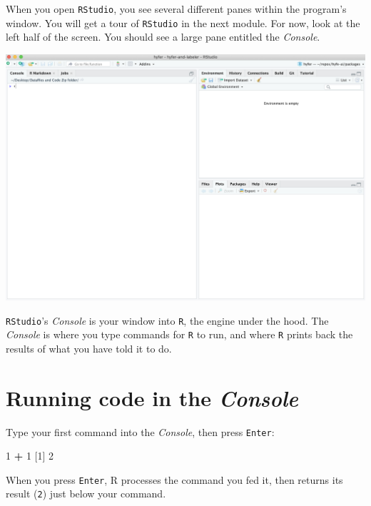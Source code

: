 \documentclass[
]{book}
\newenvironment{Shaded}{\begin{snugshade}}{\end{snugshade}}
\newcommand{\DecValTok}[1]{\textcolor[rgb]{0.00,0.00,0.81}{#1}}
\newcommand{\NormalTok}[1]{#1}
\newcommand{\OperatorTok}[1]{\textcolor[rgb]{0.81,0.36,0.00}{\textbf{#1}}}
\newcommand{\StringTok}[1]{\textcolor[rgb]{0.31,0.60,0.02}{#1}}
\begin{document}
When you open \texttt{RStudio}, you see several different panes within the program's window. You will get a tour of \texttt{RStudio} in the next module. For now, look at the left half of the screen. You should see a large pane entitled the \emph{Console}.

\includegraphics{img/rstudio_firstopen.png}

\texttt{RStudio}'s \emph{Console} is your window into \texttt{R}, the engine under the hood. The \emph{Console} is where you type commands for \texttt{R} to run, and where \texttt{R} prints back the results of what you have told it to do.

\hypertarget{running-code-in-the-console}{%
\section*{\texorpdfstring{Running code in the \emph{Console}}{Running code in the Console}}\label{running-code-in-the-console}}

Type your first command into the \emph{Console}, then press \texttt{Enter}:

\begin{Shaded}
\begin{Highlighting}[]
\DecValTok{1} \OperatorTok{+}\StringTok{ }\DecValTok{1}
\NormalTok{[}\DecValTok{1}\NormalTok{] }\DecValTok{2}
\end{Highlighting}
\end{Shaded}

When you press \texttt{Enter}, R processes the command you fed it, then returns its result (\texttt{2}) just below your command.
\end{document}
